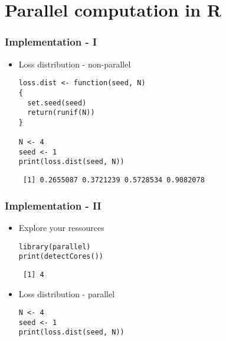 \documentclass[bigger]{beamer}
\begin{document}
\section{Parallel computation in R}
\label{sec-3}
\begin{frame}[fragile]
\frametitle{Implementation - I}
\label{sec-3-1}
\begin{itemize}

\item Loss distribution - non-parallel\\
\label{sec-3-1-1}%
\begin{verbatim}
loss.dist <- function(seed, N)
{
  set.seed(seed)
  return(runif(N))
}

N <- 4
seed <- 1
print(loss.dist(seed, N))
\end{verbatim}

\begin{verbatim}
 [1] 0.2655087 0.3721239 0.5728534 0.9082078
\end{verbatim}

\end{itemize} %
\end{frame}
\begin{frame}[fragile]
\frametitle{Implementation - II}
\label{sec-3-2}
\begin{itemize}

\item Explore your ressources\\
\label{sec-3-2-1}%
\begin{verbatim}
library(parallel)
print(detectCores())
\end{verbatim}

\begin{verbatim}
 [1] 4
\end{verbatim}


\item Loss distribution - parallel\\
\label{sec-3-2-2}%
\begin{verbatim}
N <- 4
seed <- 1
print(loss.dist(seed, N))
\end{verbatim}


\end{itemize} %
\end{frame}
\end{document}

